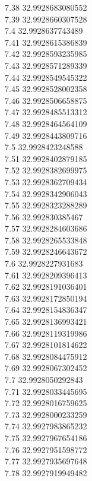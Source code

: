 {7.38	32.9928683080552\\
7.39	32.9928660307528\\
7.4	32.9928637743489\\
7.41	32.9928615386839\\
7.42	32.9928593235985\\
7.43	32.9928571289339\\
7.44	32.9928549545322\\
7.45	32.9928528002358\\
7.46	32.9928506658875\\
7.47	32.9928485513312\\
7.48	32.9928464564109\\
7.49	32.9928443809716\\
7.5	32.9928423248588\\
7.51	32.9928402879185\\
7.52	32.9928382699975\\
7.53	32.9928362709434\\
7.54	32.9928342906043\\
7.55	32.9928323288289\\
7.56	32.992830385467\\
7.57	32.9928284603686\\
7.58	32.9928265533848\\
7.59	32.9928246643672\\
7.6	32.9928227931683\\
7.61	32.9928209396413\\
7.62	32.9928191036401\\
7.63	32.9928172850194\\
7.64	32.9928154836347\\
7.65	32.9928136993421\\
7.66	32.9928119319986\\
7.67	32.9928101814622\\
7.68	32.9928084475912\\
7.69	32.9928067302452\\
7.7	32.9928050292843\\
7.71	32.9928033445695\\
7.72	32.9928016759625\\
7.73	32.9928000233259\\
7.74	32.9927983865232\\
7.75	32.9927967654186\\
7.76	32.9927951598772\\
7.77	32.9927935697648\\
7.78	32.9927919949482\\
}
